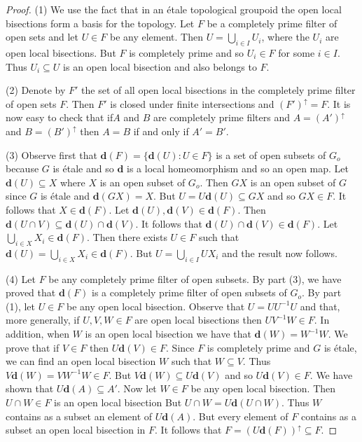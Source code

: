 \documentclass[a4paper]{amsart}
\begin{document}
\begin{proof} (1) We use the fact that in an \'etale topological groupoid the open local bisections form a basis for the topology.
Let $F$ be a completely prime filter of open sets and let $U \in F$ be any element.
Then $U = \bigcup_{i \in I} U_{i}$, where the $U_{i}$ are open local bisections.
But $F$ is completely prime and so $U_{i} \in F$ for some $i \in I$.
Thus $U_{i} \subseteq U$ is an open local bisection and also belongs to $F$. 

(2) Denote by $F'$ the set of all open local bisections in the completely prime filter of open sets $F$.
Then $F'$ is closed under finite intersections and  $(F')^{\uparrow} = F$.
It is now easy to check that if$A$ and $B$ are completely prime filters
and $A = (A')^{\uparrow}$ and $B = (B')^{\uparrow}$ then $A = B$ if and only if $A' = B'$.

(3) Observe first that
$\mathbf{d}(F) = \{ \mathbf{d}(U) \colon U \in F \}$
is a set of open subsets of $G_{o}$ because $G$ is \'etale and so $\mathbf{d}$ is a local homeomorphism and so an open map.
Let $\mathbf{d}(U) \subseteq X$ where $X$ is an open subset of $G_{o}$.
Then $GX$ is an open subset of $G$ since $G$ is \'etale and $\mathbf{d}(GX) = X$.
But $U = U\mathbf{d}(U) \subseteq GX$ and so $GX \in F$.
It follows that $X \in \mathbf{d}(F)$.
Let $\mathbf{d}(U), \mathbf{d}(V) \in \mathbf{d}(F)$.
Then $\mathbf{d}(U \cap V) \subseteq \mathbf{d}(U) \cap \mathbf{d}(V)$.
It follows that $\mathbf{d}(U) \cap \mathbf{d}(V) \in \mathbf{d}(F)$.
Let $\bigcup_{i \in X} X_{i} \in \mathbf{d}(F)$.
Then there exists $U \in F$ such that $\mathbf{d}(U) = \bigcup_{i \in X} X_{i} \in \mathbf{d}(F)$.
But $U = \bigcup_{i \in I} UX_{i}$ and the result now follows.

(4) Let $F$ be any completely prime filter of open subsets.
By part (3), we have proved that $\mathbf{d}(F)$ is a completely prime filter of open subsets of $G_{o}$.
By part (1),  let $U \in F$ be any open local bisection.
Observe that $U = UU^{-1}U$ and that,
more generally, if $U,V,W \in F$ are open local bisections then $UV^{-1}W \in F$.
In addition, when $W$ is an open local bisection we have that $\mathbf{d}(W) = W^{-1}W$.
We prove that  if $V \in F$ then $U \mathbf{d}(V) \in F$.
Since $F$ is completely prime and $G$ is \'etale,
we can find an open local bisection $W$ such that $W \subseteq V$.
Thus $V \mathbf{d}(W) = VW^{-1}W \in F$.
But $V\mathbf{d}(W) \subseteq U\mathbf{d}(V)$ and so $U\mathbf{d}(V) \in F$.
We have shown that $U\mathbf{d}(A) \subseteq A'$.
Now let $W \in F$ be any open local bisection.
Then $U \cap W \in F$ is an open local bisection
But $U \cap W = U\mathbf{d}(U \cap W)$.
Thus $W$ contains as a subset an element of $U\mathbf{d}(A)$. 
But every element of $F$ contains as a subset an open local bisection in $F$.
It follows that $F = (U\mathbf{d}(F))^{\uparrow} \subseteq F$.


\end{proof}
\end{document}
